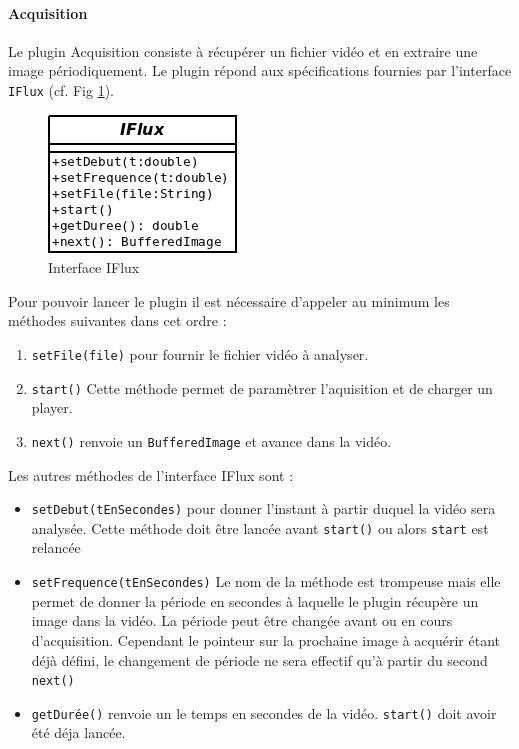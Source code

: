 \paragraph{Acquisition}
Le plugin Acquisition consiste à récupérer un fichier vidéo et en extraire une image périodiquement. Le plugin répond aux spécifications fournies par l'interface \verb+IFlux+ (cf. Fig \ref{fig:IFlux}).
\begin{figure}[htbp]
  \centering
  \includegraphics[scale=0.50]{img/IFlux}
  \caption{Interface IFlux}
  \label{fig:IFlux}
\end{figure}

Pour pouvoir lancer le plugin il est nécessaire d'appeler au minimum les méthodes suivantes dans cet ordre :
\begin{enumerate}
\item{\verb+setFile(file)+} pour fournir le fichier vidéo à analyser.
\item{\verb+start()+} Cette méthode permet de paramètrer l'aquisition et de charger un player. 
\item{\verb+next()+} renvoie un \verb+BufferedImage+ et avance dans la vidéo.
\end{enumerate}

Les autres méthodes de l'interface IFlux sont :
\begin{itemize}
\item{\verb+setDebut(tEnSecondes)+} pour donner l'instant à partir duquel la vidéo sera analysée. Cette méthode doit être lancée avant \verb+start()+ ou alors \verb+start+ est relancée
\item{\verb+setFrequence(tEnSecondes)+} Le nom de la méthode est trompeuse mais elle permet de donner la période en secondes à laquelle le plugin récupère un image dans la vidéo. La période peut être changée avant ou en cours d'acquisition. Cependant le pointeur sur la prochaine image à acquérir étant déjà défini, le changement de période ne sera effectif qu'à partir du second \verb+next()+
\item{\verb+getDurée()+} renvoie un le temps en secondes de la vidéo. \verb+start()+ doit avoir été déja lancée.
\end{itemize}

